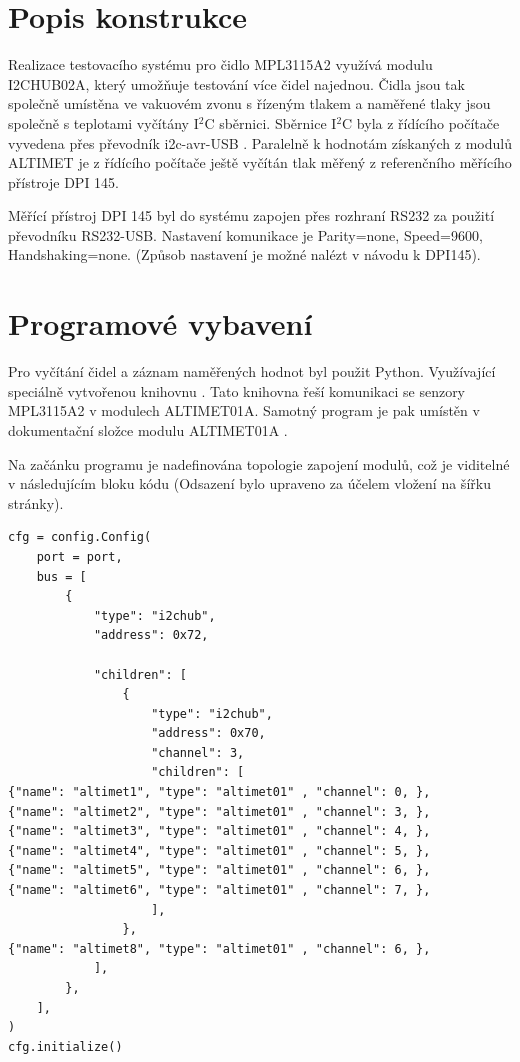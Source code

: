 \documentclass[12pt,a4paper,oneside]{article}
\begin{document}
\newpage
\tableofcontents
\newpage

\section{Popis konstrukce}

Realizace testovacího systému pro čidlo MPL3115A2 využívá modulu I2CHUB02A, který umožňuje testování více čidel najednou. Čidla jsou tak společně umístěna ve vakuovém zvonu s řízeným tlakem a naměřené tlaky jsou společně s teplotami vyčítány I$^2$C sběrnici. Sběrnice I$^2$C byla z řídícího počítače vyvedena přes převodník i2c-avr-USB \cite{i2c_avr_USB}. 
Paralelně k hodnotám získaných z modulů ALTIMET je z řídícího počítače ještě vyčítán tlak měřený z referenčního měřícího přístroje DPI 145. 

Měřící přístroj DPI 145 byl do systému zapojen přes rozhraní RS232 za použití převodníku  RS232-USB. Nastavení komunikace je Parity=none, Speed=9600, Handshaking=none. (Způsob nastavení je možné nalézt v návodu k DPI145). 

\section{Programové vybavení}

Pro vyčítání čidel a záznam naměřených hodnot byl použit Python. Využívající speciálně vytvořenou knihovnu  \cite{MLAB-I2c-modules}. Tato knihovna řeší komunikaci se senzory MPL3115A2 v modulech ALTIMET01A. Samotný program je pak umístěn v dokumentační složce modulu ALTIMET01A \cite{data_logger}.

Na začánku programu je nadefinována topologie zapojení modulů, což je viditelné v následujícím bloku kódu (Odsazení bylo upraveno za účelem vložení na šířku stránky).

\lstset{language=Python}
\begin{lstlisting}[frame=single]
cfg = config.Config(
    port = port,
    bus = [
        {
            "type": "i2chub",
            "address": 0x72,
            
            "children": [
                {
                    "type": "i2chub",
                    "address": 0x70,
                    "channel": 3,
                    "children": [
{"name": "altimet1", "type": "altimet01" , "channel": 0, },   
{"name": "altimet2", "type": "altimet01" , "channel": 3, },   
{"name": "altimet3", "type": "altimet01" , "channel": 4, },   
{"name": "altimet4", "type": "altimet01" , "channel": 5, },   
{"name": "altimet5", "type": "altimet01" , "channel": 6, },   
{"name": "altimet6", "type": "altimet01" , "channel": 7, },   
                    ], 
                },
{"name": "altimet8", "type": "altimet01" , "channel": 6, },
            ],
        },
    ],
)
cfg.initialize()
\end{lstlisting}
\end{document}
